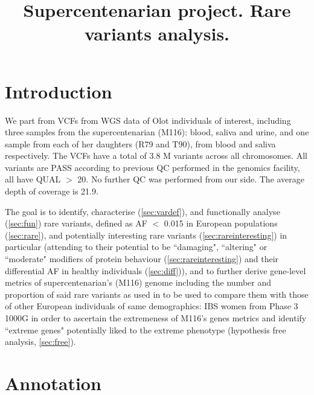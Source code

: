 \documentclass{article}\usepackage[]{graphicx}\usepackage[dvipsnames]{xcolor}
\title{\textbf{Supercentenarian project. Rare variants analysis.}}
\date {}
\begin{document}
    \maketitle
    
    
 \tableofcontents
 
\thispagestyle{firststyle}





\section{Introduction}


\label{sec:intro}
We part from VCFs from WGS data of Olot individuals of interest, including three samples from the supercentenarian (M116): blood, saliva and urine, and one sample from each of her daughters (R79 and T90), from blood and saliva respectively.
The VCFs have a total of 3.8 M variants across all chromosomes. All variants are PASS according to previous QC performed in the genomics facility, all have QUAL $>$ 20. No further QC was performed from our side. The average depth of coverage is 21.9.

The goal is to identify, characterise (\autoref{sec:vardef}), and functionally analyse (\autoref{sec:fun}) rare variants, defined as AF $<$ 0.015 in European populations (\autoref{sec:rare}), and potentially interesting rare variants (\autoref{sec:rareinteresting}) in particular (attending to their potential to be ``damaging", ``altering" or ``moderate" modifiers of protein behaviour (\autoref{sec:rareinteresting}) and their differential AF in healthy individuals (\autoref{sec:diff})), and to further derive gene-level metrics of supercentenarian's (M116) genome including the number and proportion of said rare variants as used in \cite{gierman2014whole} to be used to compare them with those of other European individuals of same demographics: IBS women from Phase 3 1000G in order to ascertain the extremeness of M116's genes metrics and identify ``extreme genes" potentially liked to the extreme phenotype (hypothesis free analysis, \autoref{sec:free}).






\section{Annotation}
\label{sec:annot}
\end{document}
